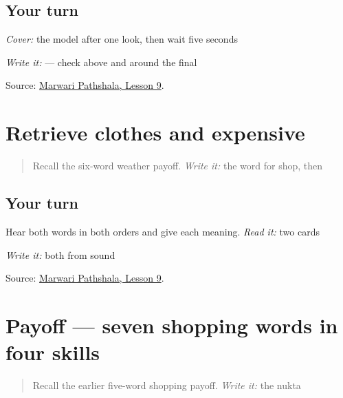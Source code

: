 \subsection*{Your turn}
\emph{Cover:} the model after one look, then wait five seconds

\emph{Write it:} \textbf{} — check \textbf{} above and \textbf{} around the final \textbf{}

\begin{tcolorbox}[breakable,colback=teal!4,colframe=teal!35!black,title={Before you move on}]
Source: \href{https://www.marwaripathshala.com/marwari-lesson-9-english}{Marwari Pathshala, Lesson 9}.
\end{tcolorbox}
\section[Practice]{Retrieve clothes and expensive}

\label{lesson:MW-R15-shopping-new-two}



\begin{quote}
Recall the six-word weather payoff. \emph{Write it:} the word for shop, then \textbf{}
\end{quote}

\subsection*{Your turn}
Hear both words in both orders and give each meaning. \emph{Read it:} two cards

\emph{Write it:} both from sound

\begin{tcolorbox}[breakable,colback=teal!4,colframe=teal!35!black,title={Before you move on}]
Source: \href{https://www.marwaripathshala.com/marwari-lesson-9-english}{Marwari Pathshala, Lesson 9}.
\end{tcolorbox}
\section[Practice]{Payoff — seven shopping words in four skills}

\label{lesson:MW-C15-shopping-seven}



\begin{quote}
Recall the earlier five-word shopping payoff. \emph{Write it:} the nukta
\end{quote}

